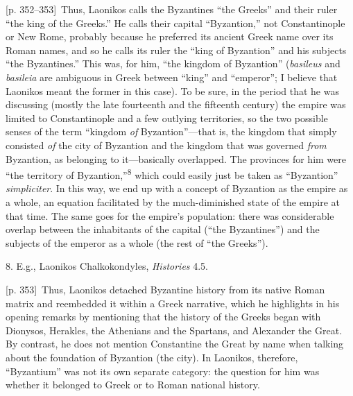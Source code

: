 \documentclass[10pt,a4paper]{article}
\begin{document}
{\scriptsize\color{gray}[p. 352–353]}\ Thus, Laonikos calls the Byzantines “the Greeks” and their ruler “the king of the Greeks.” He calls their capital “Byzantion,” not Constantinople or New Rome, probably because he preferred its ancient Greek name over its Roman names, and so he calls its ruler the “king of Byzantion” and his subjects “the Byzantines.” This was, for him, “the kingdom of Byzantion” (\textit{basileus} and \textit{basileia} are ambiguous in Greek between “king” and “emperor”; I believe that Laonikos meant the former in this case). To be sure, in the period that he was discussing (mostly the late fourteenth and the fifteenth century) the empire was limited to Constantinople and a few outlying territories, so the two possible senses of the term “kingdom \textit{of} Byzantion”—that is, the kingdom that simply consisted \textit{of} the city of Byzantion and the kingdom that was governed \textit{from} Byzantion, as belonging to it—basically overlapped. The provinces for him were “the territory of Byzantion,”\nobreak\textsuperscript{8} which could easily just be taken as “Byzantion” \textit{simpliciter}. In this way, we end up with a concept of Byzantion as the empire as a whole, an equation facilitated by the much-diminished state of the empire at that time. The same goes for the empire’s population: there was considerable overlap between the inhabitants of the capital (“the Byzantines”) and the subjects of the emperor as a whole (the rest of “the Greeks”).\par{\small 8.  E.g., Laonikos Chalkokondyles, \textit{Histories} 4.5.\par}
{\scriptsize\color{gray}[p. 353]}\ Thus, Laonikos detached Byzantine history from its native Roman matrix and reembedded it within a Greek narrative, which he highlights in his opening remarks by mentioning that the history of the Greeks began with Dionysos, Herakles, the Athenians and the Spartans, and Alexander the Great. By contrast, he does not mention Constantine the Great by name when talking about the foundation of Byzantion (the city). In Laonikos, therefore, “Byzantium” was not its own separate category: the question for him was whether it belonged to Greek or to Roman national history.\par
\end{document}
